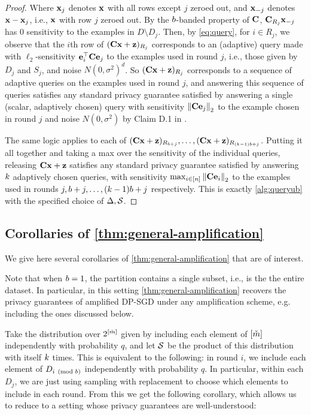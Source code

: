 \documentclass{article}
\begin{document}
\begin{proof}
Where $\mathbf{x}_j$ denotes $\mathbf{x}$ with all rows except $j$ zeroed out, and $\mathbf{x}_{-j}$ denotes $\mathbf{x} - \mathbf{x}_j$, i.e., $\mathbf{x}$ with row $j$ zeroed out. By the $b$-banded property of $\mathbf{C}$, $\mathbf{C}_{R_j} \mathbf{x}_{-j}$ has 0 sensitivity to the examples in $D \setminus D_j$. Then, by \cref{eq:query}, for $i \in R_j$, we observe that the $i$th row of $(\mathbf{C} \mathbf{x} + \mathbf{z})_{R_j}$ corresponds to an (adaptive) query made with $\ell_2$-sensitivity $\mathbf{e}_i^\top \mathbf{C} \mathbf{e}_j$ to the examples used in round $j$, i.e., those given by $D_j$ and $S_j$, and noise $N(0, \sigma^2)^d$. So $(\mathbf{C} \mathbf{x} + \mathbf{z})_{R_j}$ corresponds to a sequence of adaptive queries on the examples used in round $j$, and answering this sequence of queries satisfies any standard privacy guarantee satisfied by answering a single (scalar, adaptively chosen) query with sensitivity $\left\|\mathbf{C} \mathbf{e}_j\right\|_2$ to the example chosen in round $j$ and noise $N(0, \sigma^2)$ by Claim D.1 in \cite{denisov22matfact}.

The same logic applies to each of $(\mathbf{C} \mathbf{x} + \mathbf{z})_{R_{b + j}}, \ldots, (\mathbf{C} \mathbf{x} + \mathbf{z})_{R_{(k - 1) b + j}}$. Putting it all together and taking a max over the sensitivity of the individual queries, releasing $\mathbf{C} \mathbf{x} + \mathbf{z}$ satisfies any standard privacy guarantee satisfied by answering $k$ adaptively chosen queries, with sensitivity $\max_{i \in [n]} \left\|\mathbf{C} \mathbf{e}_i\right\|_2$ to the examples used in rounds $j, b + j, \ldots, (k - 1) b + j$ respectively. This is exactly \cref{alg:queryub} with the specified choice of $\Delta, \mathcal{S}$.
\end{proof}
\subsection{Corollaries of \cref{thm:general-amplification}}\label{sec:amp-corollaries}

We give here several corollaries of \cref{thm:general-amplification} that are of interest.

 Note that when $b = 1$, the partition contains a single subset, i.e., is the the entire dataset. In particular, in this setting \cref{thm:general-amplification} recovers the privacy guarantees of amplified DP-SGD under any amplification scheme, e.g. including the ones discussed below.

 Take the distribution over $2^{[\check{m}]}$ given by including each element of $[\check{m}]$ independently with probability $q$, and let $\mathcal{S}$ be the product of this distribution with itself $k$ times. This is equivalent to the following: in round $i$, we include each element of $D_{i \pmod {b}}$ independently with probability $q$. In particular, within each $D_j$, we are just using sampling with replacement to choose which elements to include in each round. From this we get the following corollary, which allows us to reduce to a setting whose privacy guarantees are well-understood:
\end{document}
